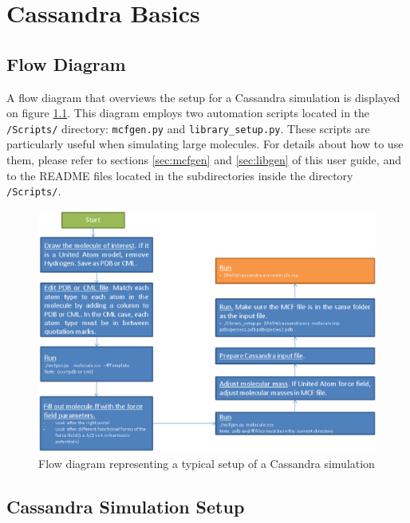%
\chapter{Cassandra Basics}
\section{Flow Diagram}
A flow diagram that overviews the setup for a Cassandra simulation is displayed on figure \ref{fig:flow_diagram}. 
This diagram employs two automation scripts located in the \texttt{/Scripts/} directory: \texttt{mcfgen.py} and \texttt{library\_setup.py}.
These scripts are particularly useful when simulating large molecules. 
For details about how to use them, please refer to sections \ref{sec:mcfgen} and \ref{sec:libgen} of this user guide, and to the README files located in 
the subdirectories inside the directory \texttt{/Scripts/}.

\begin{figure}[t]
\includegraphics[width=\linewidth]{setup_flowdiagram.eps}
\caption{Flow diagram representing a typical setup of a Cassandra simulation}\label{fig:flow_diagram}
\end{figure}




\section{Cassandra Simulation Setup}


